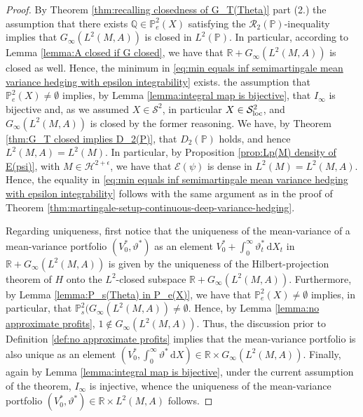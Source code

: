 \documentclass[11pt,a4paper,twoside,openany]{report}
\numberwithin{equation}{section}
\newcommand{\diff}{\mathrm{d}}
\theoremstyle{plain} %
\theoremstyle{definition} %
\theoremstyle{remark} %
\begin{document}
\begin{proof}
   By Theorem \ref{thm:recalling closedness of G_T(Theta)} part (2.) the assumption that there exists \(\mathbb{Q}\in\mathbb{P}_e^2(X)\) satisfying the \(\mathcal{R}_2(\mathbb{P})\)-inequality implies that \(G_{\infty}(L^2(M,A))\) is closed in \(L^2(\mathbb{P})\). In particular, according to Lemma \ref{lemma:A closed if G closed}, we have that \(\mathbb{R}+G_{\infty}(L^2(M,A))\) is closed as well. Hence, the minimum in \eqref{eq:min equals inf semimartingale mean variance hedging with epsilon integrability} exists. 
   the assumption that \(\mathbb{P}_e^2(X)\neq\emptyset\) implies, by Lemma \ref{lemma:integral map is bijective}, that \(I_{\infty}\) is bijective and, as we assumed \(X\in\mathcal{S}^2\), in particular \(X\in\mathcal{S}_{\rm{loc}}^2\), and \(G_{\infty}(L^2(M,A))\) is closed by the former reasoning. We have, by Theorem \ref{thm:G_T closed implies D_2(P)}, that \(D_2(\mathbb{P})\) holds, and hence \(L^2(M,A) = L^2(M)\). In particular, by Proposition \ref{prop:Lp(M) density of E(psi)}, with \(M\in\mathcal{H}^{2+\epsilon}\), we have that \(\mathcal{E}(\psi)\) is dense in \(L^2(M)=L^2(M,A)\). Hence, the equality in \eqref{eq:min equals inf semimartingale mean variance hedging with epsilon integrability} follows with the same argument as in the proof of Theorem \ref{thm:martingale-setup-continuous-deep-variance-hedging}.

   Regarding uniqueness, first notice that the uniqueness of the mean-variance of a mean-variance portfolio \((V_0^*,\vartheta^*)\) as an element \(V_0^*+\int_0^\infty\vartheta_t^*\,\diff X_t\) in \(\mathbb{R}+G_{\infty}(L^2(M,A))\) is given by the uniqueness of the Hilbert-projection theorem of \(H\) onto the \(L^2\)-closed subspace \(\mathbb{R}+G_{\infty}(L^2(M,A))\). Furthermore, by Lemma \ref{lemma:P_s(Theta) in P_e(X)}, we have that \(\mathbb{P}_e^2(X)\neq \emptyset\) implies, in particular, that \(\mathbb{P}_s^2(G_{\infty}(L^2(M,A))\neq \emptyset\). Hence, by Lemma \ref{lemma:no approximate profits}, \(1\notin G_{\infty}(L^2(M,A))\). Thus, the discussion prior to Definition \ref{def:no approximate profits} implies that the mean-variance portfolio is also unique as an element  \((V_0^*,\int_0^\infty\vartheta^*\,\diff X)\in\mathbb{R}\times G_{\infty}(L^2(M,A))\). Finally, again by Lemma \ref{lemma:integral map is bijective}, under the current assumption of the theorem, \(I_{\infty}\) is injective, whence the uniqueness of the mean-variance portfolio \((V_0^*,\vartheta^*)\in\mathbb{R}\times L^2(M,A)\) follows.
\end{proof}
\end{document}
